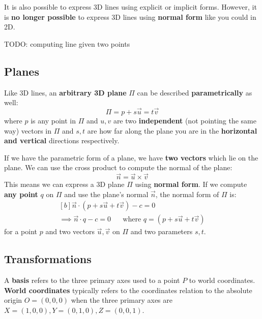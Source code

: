 \documentclass{article}
\begin{document}
It is also possible to express 3D lines using explicit or implicit forms. However, it is \textbf{no longer possible} to express 3D lines using \textbf{normal form} like you could in 2D.

TODO: computing line given two points

\subsection{Planes}

Like 3D lines, an \textbf{arbitrary 3D plane} $\Pi$ can be described \textbf{parametrically} as well:
\begin{equation}
	\Pi = p + s\vec{u} = t\vec{v}
	\label{eq:parametric-3d-plane}
\end{equation}
where $p$ is any point in $\Pi$ and $u,v$ are two \textbf{independent} (not pointing the same way) vectors in $\Pi$ and $s,t$ are how far along the plane you are in the \textbf{horizontal and vertical} directions respectively.

If we have the parametric form of a plane, we have \textbf{two vectors} which lie on the plane. We can use the cross product to compute the normal of the plane:
\begin{equation}
	\vec{n} = \vec{u} \times \vec{v}
\end{equation}
This means we can express a 3D plane $\Pi$ using \textbf{normal form}. If we compute \textbf{any point} $q$ on $\Pi$ and use the plane's normal $\vec{n}$, the normal form of $\Pi$ is:
\begin{equation}
\begin{aligned}[b]
	\vec{n} \cdot (p + s\vec{u} + t\vec{v}) - c = 0 \\
	\implies \vec{n} \cdot q - c = 0
	\;\;\;\;\;\; \text{where }q = (p + s\vec{u} + t\vec{v})
\end{aligned}
	\label{eq:3d-plane-normal-form}
\end{equation}
for a point $p$ and two vectors $\vec{u},\vec{v}$ on $\Pi$ and two parameters $s,t$.

\subsection{Transformations}

A \textbf{basis} refers to the three primary axes used to  a point $P$ to world coordinates. \textbf{World coordinates} typically refers to the coordinates relation to the absolute origin $O = (0, 0, 0)$ when the three primary axes are $X = (1, 0, 0), Y = (0, 1, 0), Z = (0, 0, 1)$.
\end{document}
